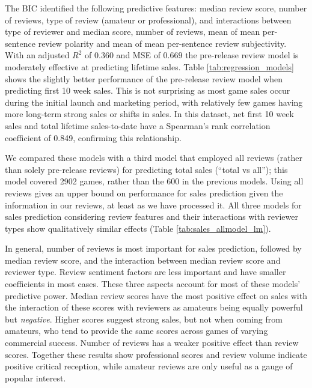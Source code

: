 \documentclass{sig-alternate}
\begin{document}
The BIC identified the following predictive features: median review score, number of reviews, type of review (amateur or professional), and interactions between type of reviewer and median score, number of reviews, mean of mean per-sentence review polarity and mean of mean per-sentence review subjectivity.
With an adjusted $R^2$ of $0.360$ and MSE of $0.669$ the pre-release review model is moderately effective at predicting lifetime sales. Table \ref{tab:regression_models} shows the slightly better performance of the pre-release review model when predicting first 10 week sales. This is not surprising as most game sales occur during the initial launch and marketing period, with relatively few games having more long-term strong sales or shifts in sales. In this dataset, net first 10 week sales and total lifetime sales-to-date have a Spearman's rank correlation coefficient of 0.849, confirming this relationship.

We compared these models with a third model that employed all reviews (rather than solely pre-release reviews) for predicting total sales (``total vs all''); this model covered 2902 games, rather than the 600 in the previous models. Using all reviews gives an upper bound on performance for sales prediction given the information in our reviews, at least as we have processed it. All three models for sales prediction considering review features and their interactions with reviewer types show qualitatively similar effects (Table \ref{tab:sales_allmodel_lm}). 

In general, number of reviews is most important for sales prediction, followed by median review score, and the interaction between median review score and reviewer type. Review sentiment factors are less important and have smaller coefficients in most cases. These three aspects account for most of these models' predictive power. Median review scores have the most positive effect on sales with the interaction of these scores with reviewers as amateurs being equally powerful but \textit{negative}. Higher scores suggest strong sales, but not when coming from amateurs, who tend to provide the same scores across games of varying commercial success. Number of reviews has a weaker positive effect than review scores. Together these results show professional scores and review volume indicate positive critical reception, while amateur reviews are only useful as a gauge of popular interest.
\end{document}
